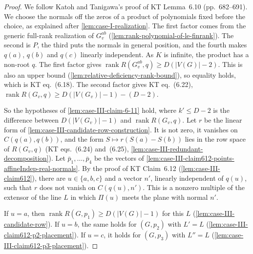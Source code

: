 \begin{proof}
  \leanok
  We follow Katoh and Tanigawa's proof of KT Lemma~6.10 (pp.~682--691).
  We choose the normals off the zeros of a product of polynomials fixed
  before the choice, as explained after \cref{lem:case-I-realization}.
  The first factor comes from the generic full-rank realization of
  $G_v^{ab}$ (\cref{lem:rank-polynomial-of-le-finrank}). The second is
  $P$, the third puts the normals in general position, and the fourth
  makes $q(a)$, $q(b)$ and $q(c)$ linearly independent. As $K$ is
  infinite, the product has a non-root $q$. The first factor gives
  $\operatorname{rank} R(G_v^{ab}, q) \ge D(|V(G)| - 2)$. This is also
  an upper bound (\cref{lem:relative-deficiency-rank-bound}), so
  equality holds, which is KT eq.~(6.18). The second factor gives KT
  eq.~(6.22), $\operatorname{rank} R(G_v, q) \ge D(|V(G_v)| - 1) - (D - 2)$.

  So the hypotheses of \cref{lem:case-III-claim-6-11} hold, where
  $k' \le D - 2$ is the difference between $D(|V(G_v)| - 1)$ and
  $\operatorname{rank} R(G_v, q)$. Let $r$ be the linear form of
  \cref{lem:case-III-candidate-row-construction}. It is not zero, it vanishes on $C(q(a), q(b))$, and the form
  $S \mapsto r(S(a) - S(b))$ lies in the row space of $R(G_v, q)$ (KT
  eqs.~(6.24) and~(6.25), \cref{lem:case-III-redundant-decomposition}).
  Let $\bar p_1, \dots, \bar p_4$ be the vectors of
  \cref{lem:case-III-claim612-points-affineIndep-real-normals}. By the
  proof of KT Claim~6.12 (\cref{lem:case-III-claim612}), there are
  $u \in \{a, b, c\}$ and a vector $n'$, linearly independent of $q(u)$,
  such that $r$ does not vanish on $C(q(u), n')$. This is a nonzero
  multiple of the extensor of the line $L$ in which $\Pi(u)$ meets the
  plane with normal $n'$.

  If $u = a$, then $\operatorname{rank} R(G, p_1) \ge D(|V(G)| - 1)$ for
  this $L$ (\cref{lem:case-III-candidate-row}). If $u = b$, the same
  holds for $(G, p_2)$ with $L' = L$
  (\cref{lem:case-III-claim612-p2-placement}). If $u = c$, it holds for
  $(G, p_3)$ with $L'' = L$ (\cref{lem:case-III-claim612-p3-placement}).


\end{proof}
